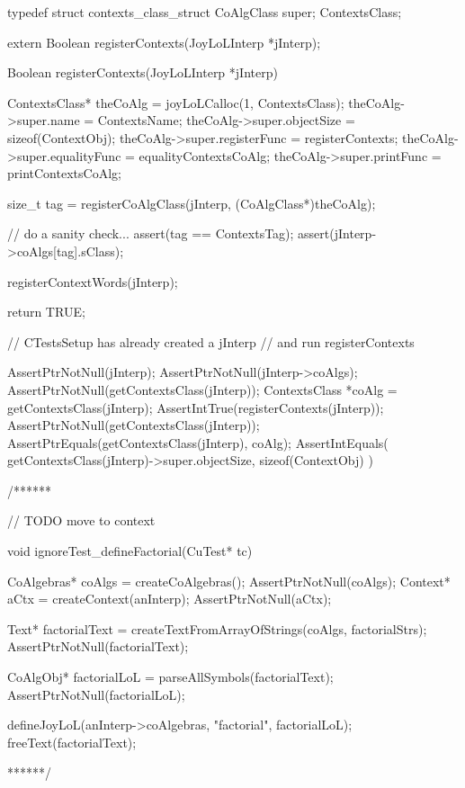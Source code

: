 \startTestSuite[registerContexts]

\startCHeader
typedef struct contexts_class_struct {
  CoAlgClass super;
} ContextsClass;
\stopCHeader

\startCHeader
extern Boolean registerContexts(JoyLoLInterp *jInterp);
\stopCHeader
{}

\startCCode
Boolean registerContexts(JoyLoLInterp *jInterp) {
  ContextsClass* theCoAlg    = 
    joyLoLCalloc(1, ContextsClass);
  theCoAlg->super.name         = ContextsName;
  theCoAlg->super.objectSize   = sizeof(ContextObj);
  theCoAlg->super.registerFunc = registerContexts;
  theCoAlg->super.equalityFunc = equalityContextsCoAlg;
  theCoAlg->super.printFunc    = printContextsCoAlg;
  
  size_t tag =
    registerCoAlgClass(jInterp, (CoAlgClass*)theCoAlg);

  // do a sanity check...
  assert(tag == ContextsTag);
  assert(jInterp->coAlgs[tag].sClass);
  
  registerContextWords(jInterp);
  
  return TRUE;
}
\stopCCode


\startCTest
  // CTestsSetup has already created a jInterp
  // and run registerContexts
  
  AssertPtrNotNull(jInterp);
  AssertPtrNotNull(jInterp->coAlgs);
  AssertPtrNotNull(getContextsClass(jInterp));
  ContextsClass *coAlg = getContextsClass(jInterp);
  AssertIntTrue(registerContexts(jInterp));
  AssertPtrNotNull(getContextsClass(jInterp));
  AssertPtrEquals(getContextsClass(jInterp), coAlg);
  AssertIntEquals(
    getContextsClass(jInterp)->super.objectSize,
    sizeof(ContextObj)
  )
\stopCTest

\stopTestCase
\stopTestSuite


\starttyping
/******

// TODO move to context


void ignoreTest_defineFactorial(CuTest* tc) {
  CoAlgebras* coAlgs = createCoAlgebras();
  AssertPtrNotNull(coAlgs);
  Context* aCtx = createContext(anInterp);
  AssertPtrNotNull(aCtx);

  Text* factorialText = createTextFromArrayOfStrings(coAlgs, factorialStrs);
  AssertPtrNotNull(factorialText);

  CoAlgObj* factorialLoL = parseAllSymbols(factorialText);
  AssertPtrNotNull(factorialLoL);

  defineJoyLoL(anInterp->coAlgebras, "factorial", factorialLoL);
  freeText(factorialText);
}
******/
\stoptyping
